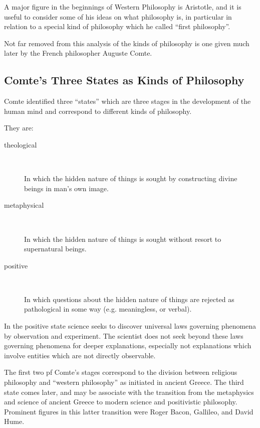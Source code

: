 \documentclass[10pt,titlepage]{article}
\begin{document}
A major figure in the beginnings of Western Philosophy is Aristotle, and it is useful to consider some of his ideas on what philosophy is, in particular in relation to a special kind of philosophy which he called ``first philosophy''.

Not far removed from this analysis of the kinds of philosophy is one given much later by the French philosopher Auguste Comte.

\subsection{Comte's Three States as Kinds of Philosophy}

Comte identified three ``states'' which are three stages in the development of the human mind and correspond to different kinds of philosophy.

They are:

\begin{center}
\begin{description}
\item[theological] \ 

    In which the hidden nature of things is sought by constructing divine beings in man's own image.

\item[metaphysical] \ 

    In which the hidden nature of things is sought without resort to supernatural beings.

\item[positive] \ 

    In which questions about the hidden nature of things are rejected as pathological in some way (e.g. meaningless, or verbal).
\end{description}
\end{center}

    In the positive state science seeks to discover universal laws governing phenomena by observation and experiment. The scientist does not seek beyond these laws governing phenomena for deeper explanations, especially not explanations which involve entities which are not directly observable.

The first two pf Comte's stages correspond to the division between religious philosophy and ``western philosophy'' as initiated in ancient Greece.
The third state comes later, and may be associate with the transition from the metaphysics and science of ancient Greece to modern science and positivistic philosophy.
Prominent figures in this latter transition were Roger Bacon, Gallileo, and David Hume.
\end{document}

